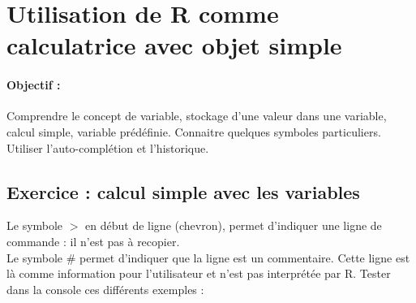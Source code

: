\section{Utilisation de R comme calculatrice avec objet simple}

\paragraph{Objectif : } Comprendre le concept de variable, stockage d'une valeur dans une variable, calcul simple, variable prédéfinie. Connaitre quelques symboles particuliers. Utiliser l'auto-complétion et l'historique.
\subsection{Exercice : calcul simple avec les variables}
Le symbole $>$ en début de ligne (chevron), permet d'indiquer une ligne de commande : il n'est pas à recopier. \\
Le symbole \# permet d'indiquer que la ligne est un commentaire. Cette ligne est là comme information pour l'utilisateur et n'est pas interprétée par R.
Tester dans la console ces différents exemples :


